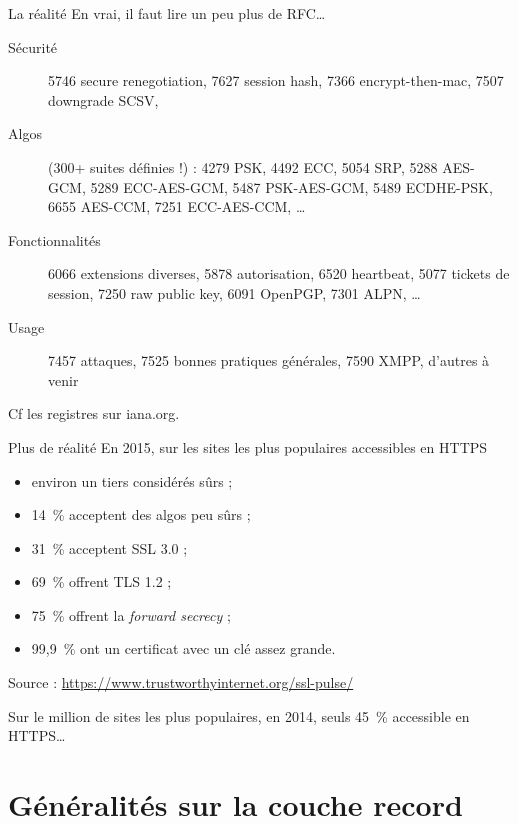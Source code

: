 \documentclass{mpg-ep-slides}
\begin{document}
\begin{frame}{La réalité}
  En vrai, il faut lire un peu plus de RFC\dots

  \begin{description}
    \item[Sécurité] 5746 secure renegotiation, 7627 session hash, 7366
      encrypt-then-mac, 7507 downgrade SCSV,
    \item[Algos] (300+ suites définies !) : 4279 PSK, 4492 ECC, 5054 SRP, 5288
      AES-GCM, 5289 ECC-AES-GCM, 5487 PSK-AES-GCM, 5489 ECDHE-PSK, 6655
      AES-CCM, 7251 ECC-AES-CCM, \dots
    \item[Fonctionnalités] 6066 extensions diverses, 5878 autorisation, 6520
      heartbeat, 5077 tickets de session, 7250 raw public key, 6091 OpenPGP,
      7301 ALPN, \dots
    \item[Usage] 7457 attaques, 7525 bonnes pratiques générales, 7590 XMPP,
      d'autres à venir
  \end{description}

  Cf les registres sur iana.org.
\end{frame}

\begin{frame}{Plus de réalité}
  En 2015, sur les sites les plus populaires accessibles en HTTPS
  \begin{itemize}
    \item environ un tiers considérés sûrs ;
    \item 14~\% acceptent des algos peu sûrs ;
    \item 31~\% acceptent SSL 3.0 ;
    \item 69~\% offrent TLS 1.2 ;
    \item 75~\% offrent la \emph{forward secrecy} ;
    \item 99,9~\% ont un certificat avec un clé assez grande.
  \end{itemize}

  Source : \url{https://www.trustworthyinternet.org/ssl-pulse/}

  \medskip

  Sur le million de sites les plus populaires, en 2014, seuls 45~\%
  accessible en HTTPS\dots
\end{frame}


\section[Couche record]{Généralités sur la couche record}
\tocsect
\end{document}
